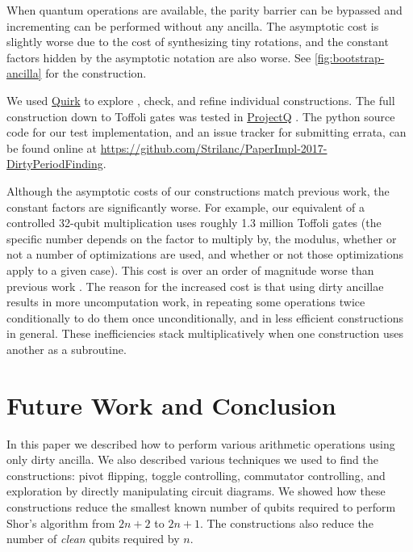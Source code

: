 \documentclass[twocolumn,longbibliography]{quantumarticle}
\begin{document}
When quantum operations are available, the parity barrier can be bypassed and incrementing can be performed without any ancilla.
The asymptotic cost is slightly worse due to the cost of synthesizing tiny rotations, and the constant factors hidden by the asymptotic notation are also worse.
See \autoref{fig:bootstrap-ancilla} for the construction.

We used \href{https://github.com/Strilanc/Quirk}{Quirk} \cite{quirk2016} to explore \cite{victor2013}, check, and refine individual constructions.
The full construction down to Toffoli gates was tested in \href{https://github.com/ProjectQ-Framework/ProjectQ}{ProjectQ} \cite{projq2016}.
The python source code for our test implementation, and an issue tracker for submitting errata, can be found online at \href{https://github.com/Strilanc/PaperImpl-2017-DirtyPeriodFinding}{https://github.com/Strilanc/PaperImpl-2017-DirtyPeriodFinding}.

Although the asymptotic costs of our constructions match previous work, the constant factors are significantly worse.
For example, our equivalent of a controlled 32-qubit multiplication uses roughly 1.3 million Toffoli gates (the specific number depends on the factor to multiply by, the modulus, whether or not a number of optimizations are used, and whether or not those optimizations apply to a given case).
This cost is over an order of magnitude worse than previous work \cite{haner2016}.
The reason for the increased cost is that using dirty ancillae results in more uncomputation work, in repeating some operations twice conditionally to do them once unconditionally, and in less efficient constructions in general.
These inefficiencies stack multiplicatively when one construction uses another as a subroutine.


\section{Future Work and Conclusion} \label{sec:conclusion}

In this paper we described how to perform various arithmetic operations using only dirty ancilla.
We also described various techniques we used to find the constructions: pivot flipping, toggle controlling, commutator controlling, and exploration by directly manipulating circuit diagrams.
We showed how these constructions reduce the smallest known number of qubits required to perform Shor's algorithm from $2n+2$ to $2n+1$.
The constructions also reduce the number of {\em clean} qubits required by $n$.
\end{document}
